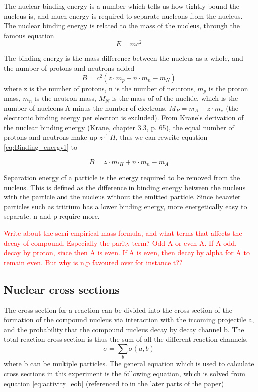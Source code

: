 \documentclass[a4paper,11pt,twoside]{book}
\begin{document}
The nuclear binding energy is a number which tells us how tightly bound the nucleus is, and much energy is required to separate nucleons from the nucleus. The nuclear binding energy is related to the mass of the nucleus, through the famous equation 
\begin{equation}
    E = mc^2
\end{equation}

\noindent 
The binding energy is the mass-difference between the nucleus as a whole, and the number of protons and neutrons added
\begin{equation} \label{eq:Binding_energy1}
    B = c^2(z\cdot m_p + n \cdot m_n - m_N)
\end{equation}
\noindent where z is the number of protons, n is the number of neutrons, $m_p$ is the proton mass, $m_n$ is the neutron mass, $M_N$ is the mass of of the nuclide, which is the number of nucleons A minus the number of electrons, $M_P = m_A - z\cdot m_e$ (the electronic binding energy per electron is excluded). From Krane's derivation of the nuclear binding energy (Krane, chapter 3.3, p. 65), the equal number of protons and neutrons make up $z\cdot^1H$, thus we can rewrite equation \ref{eq:Binding_energy1} to 

\begin{equation}
    B = z\cdot m_{^{1}H} + n\cdot m_n - m_{A}
\end{equation}

\noindent 
Separation energy of a particle is the energy required to be removed from the nucleus. This is defined as the difference in binding energy between the nucleus with the particle and the nucleus without the emitted particle. Since heaavier particles such as tritrium has a lower binding energy, more energetically easy to separate. n and p require more. 

\textcolor{red}{Write about the semi-empirical mass formula, and what terms that affects the decay of compound. Especially the parity term? Odd A or even A. If A odd, decay by proton, since then A is even. If A is even, then decay by alpha for A to remain even. But why is n,p favoured over for instance t?? }

\subsection{Nuclear cross sections}

The cross section for a reaction can be divided into the cross section of the formation of the compound nucleus via interaction with the incoming projectile a, and the probability that the compound nucleus decay by decay channel b. The total reaction cross section is thus the sum of all the different reaction channels, 
\begin{equation}
    \sigma = \sum_b \sigma(a,b)
\end{equation}
where b can be multiple particles. The general equation which is used to calculate cross sections in this experiment is the following equation, which is solved from equation \ref{eq:activity_eob} (referenced to in the later parts of the paper)
\end{document}
